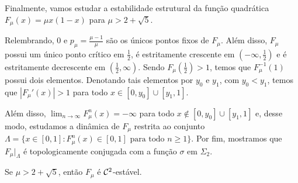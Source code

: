 Finalmente, vamos estudar a estabilidade estrutural da função quadrática $F_\mu(x) = \mu x(1-x)$ para $\mu > 2 + \sqrt{5}$.

Relembrando, $0$ e $p_\mu = \frac{\mu - 1}{\mu}$ são os únicos pontos fixos de $F_\mu$. Além disso, $F_\mu$ possui um único ponto crítico em $\frac{1}{2}$, é estritamente crescente em $\left(-\infty, \frac{1}{2}\right)$ e é estritamente decrescente em $\left(\frac{1}{2}, \infty \right)$. Sendo $F_\mu \left(\frac{1}{2} \right) > 1$, temos que $F_\mu^{-1}(1)$ possui dois elementos. Denotando tais elementos por $y_0$ e $y_1$, com $y_0 < y_1$, temos que $|F_\mu'(x)| > 1$ para todo $x \in [0, y_0] \cup [y_1, 1]$.

Além disso, $\lim_{n \to \infty} F_\mu^n(x) = - \infty$ para todo $x \notin [0, y_0] \cup [y_1, 1]$ e, desse modo, estudamos a dinâmica de $F_\mu$ restrita ao conjunto $\Lambda = \{ x \in [0,1] : F_\mu^n(x) \in  [0, 1] \textrm{ para todo } n \geq 1\}$. Por fim, mostramos que $F_\mu|_\Lambda$ é topologicamente conjugada com a função $\sigma$ em $\Sigma_2$.

\begin{theorem}
Se $\mu > 2 + \sqrt{5}$, então $F_\mu$ é $\mathcal{C}^2$-estável.
\end{theorem}

